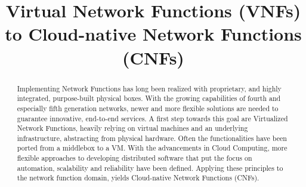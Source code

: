 \documentclass[conference, a4paper]{IEEEtran}
\begin{document}
%
\title{Virtual Network Functions (VNFs) to Cloud-native Network Functions (CNFs)}

\author{
}

\maketitle

\begin{abstract}
Implementing Network Functions has long been realized with proprietary, and highly integrated, purpose-built physical boxes. With the growing capabilities of fourth and especially fifth generation networks, newer and more flexible solutions are needed to guarantee innovative, end-to-end services. A first step towards this goal are Virtualized Network Functions, heavily relying on virtual machines and an underlying infrastructure, abstracting from physical hardware. Often the functionalities have been ported from a middlebox to a VM. With the advancements in Cloud Computing, more flexible approaches to developing distributed software that put the focus on automation, scalability and reliability have been defined. Applying these principles to the network function domain, yields Cloud-native Network Functions (CNFs).
\end{abstract}

\IEEEpeerreviewmaketitle






\end{document}
